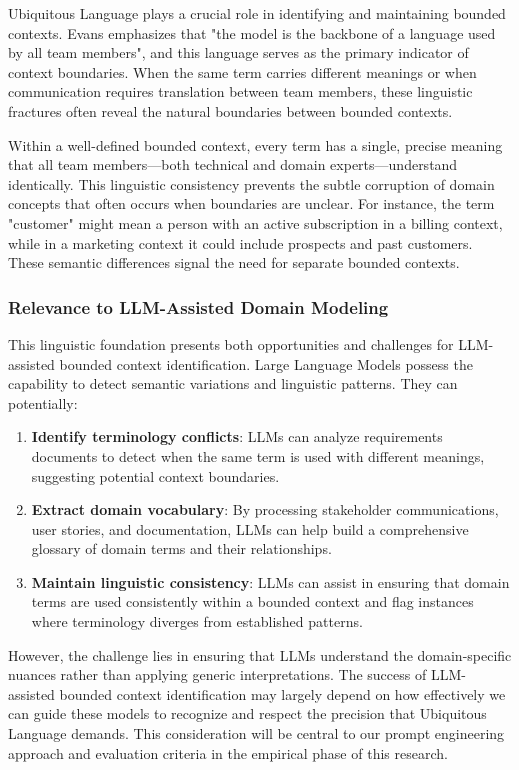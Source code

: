 Ubiquitous Language plays a crucial role in identifying and maintaining bounded contexts. Evans \autocite[p.~13]{Evans2003} emphasizes that "the model is the backbone of a language used by all team members", and this language serves as the primary indicator of context boundaries. When the same term carries different meanings or when communication requires translation between team members, these linguistic fractures often reveal the natural boundaries between bounded contexts.

Within a well-defined bounded context, every term has a single, precise meaning that all team members—both technical and domain experts—understand identically. This linguistic consistency prevents the subtle corruption of domain concepts that often occurs when boundaries are unclear. For instance, the term "customer" might mean a person with an active subscription in a billing context, while in a marketing context it could include prospects and past customers. These semantic differences signal the need for separate bounded contexts.

\subsubsection{Relevance to LLM-Assisted Domain Modeling}
This linguistic foundation presents both opportunities and challenges for LLM-assisted bounded context identification. Large Language Models possess the capability to detect semantic variations and linguistic patterns. They can potentially:

\begin{enumerate}
    \item \textbf{Identify terminology conflicts}: LLMs can analyze requirements documents to detect when the same term is used with different meanings, suggesting potential context boundaries.
    
    \item \textbf{Extract domain vocabulary}: By processing stakeholder communications, user stories, and documentation, LLMs can help build a comprehensive glossary of domain terms and their relationships.
    
    \item \textbf{Maintain linguistic consistency}: LLMs can assist in ensuring that domain terms are used consistently within a bounded context and flag instances where terminology diverges from established patterns.
\end{enumerate}

However, the challenge lies in ensuring that LLMs understand the domain-specific nuances rather than applying generic interpretations. The success of LLM-assisted bounded context identification may largely depend on how effectively we can guide these models to recognize and respect the precision that Ubiquitous Language demands. This consideration will be central to our prompt engineering approach and evaluation criteria in the empirical phase of this research.

